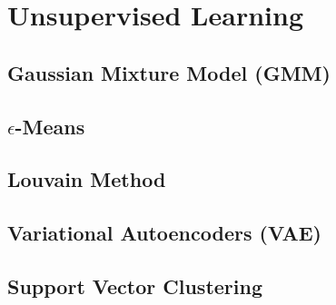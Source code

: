 \section{Unsupervised Learning}
\label{additional:unsupervised}

\subsection{Gaussian Mixture Model (GMM)}
\label{additional:unsupervised:GMM}

\subsection{\texorpdfstring{$\epsilon$}{epsilon}-Means}
\label{additional:unsupervised:epsilonMean}

\subsection{Louvain Method}
\label{additional:unsupervised:louvain}

\subsection{Variational Autoencoders (VAE)}
\label{additional:unsupervised:VAE}

\subsection{Support Vector Clustering}
\label{additional:unsupervised:SVC}

